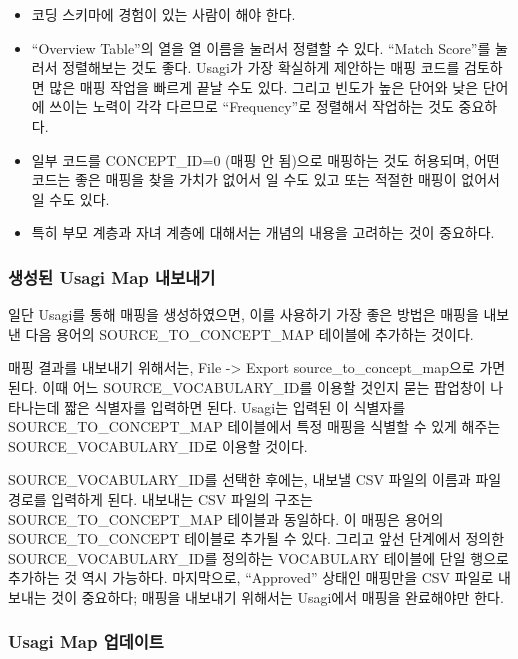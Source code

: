 \documentclass[10.5pt]{book}
\providecommand{\tightlist}{%
  \setlength{\itemsep}{0pt}\setlength{\parskip}{0pt}}
\theoremstyle{definition}
\theoremstyle{definition}
\theoremstyle{definition}
\theoremstyle{remark}
\begin{document}
\begin{itemize}
\tightlist
\item
  코딩 스키마에 경험이 있는 사람이 해야 한다.
\item
  ``Overview Table''의 열을 열 이름을 눌러서 정렬할 수 있다. ``Match
  Score''를 눌러서 정렬해보는 것도 좋다. Usagi가 가장 확실하게 제안하는
  매핑 코드를 검토하면 많은 매핑 작업을 빠르게 끝날 수도 있다. 그리고
  빈도가 높은 단어와 낮은 단어에 쓰이는 노력이 각각 다르므로
  ``Frequency''로 정렬해서 작업하는 것도 중요하다.
\item
  일부 코드를 CONCEPT\_ID=0 (매핑 안 됨)으로 매핑하는 것도 허용되며,
  어떤 코드는 좋은 매핑을 찾을 가치가 없어서 일 수도 있고 또는 적절한
  매핑이 없어서 일 수도 있다.
\item
  특히 부모 계층과 자녀 계층에 대해서는 개념의 내용을 고려하는 것이
  중요하다.
\end{itemize}

\subsubsection*{생성된 Usagi Map 내보내기}\label{-usagi-map-}

일단 Usagi를 통해 매핑을 생성하였으면, 이를 사용하기 가장 좋은 방법은
매핑을 내보낸 다음 용어의 SOURCE\_TO\_CONCEPT\_MAP 테이블에 추가하는
것이다.

매핑 결과를 내보내기 위해서는, File -\textgreater{} Export
source\_to\_concept\_map으로 가면 된다. 이때 어느
SOURCE\_VOCABULARY\_ID를 이용할 것인지 묻는 팝업창이 나타나는데 짧은
식별자를 입력하면 된다. Usagi는 입력된 이 식별자를
SOURCE\_TO\_CONCEPT\_MAP 테이블에서 특정 매핑을 식별할 수 있게 해주는
SOURCE\_VOCABULARY\_ID로 이용할 것이다.

SOURCE\_VOCABULARY\_ID를 선택한 후에는, 내보낼 CSV 파일의 이름과 파일
경로를 입력하게 된다. 내보내는 CSV 파일의 구조는
SOURCE\_TO\_CONCEPT\_MAP 테이블과 동일하다. 이 매핑은 용어의
SOURCE\_TO\_CONCEPT 테이블로 추가될 수 있다. 그리고 앞선 단계에서 정의한
SOURCE\_VOCABULARY\_ID를 정의하는 VOCABULARY 테이블에 단일 행으로
추가하는 것 역시 가능하다. 마지막으로, ``Approved'' 상태인 매핑만을 CSV
파일로 내보내는 것이 중요하다; 매핑을 내보내기 위해서는 Usagi에서 매핑을
완료해야만 한다.

\subsubsection*{Usagi Map 업데이트}\label{usagi-map-}
\end{document}
